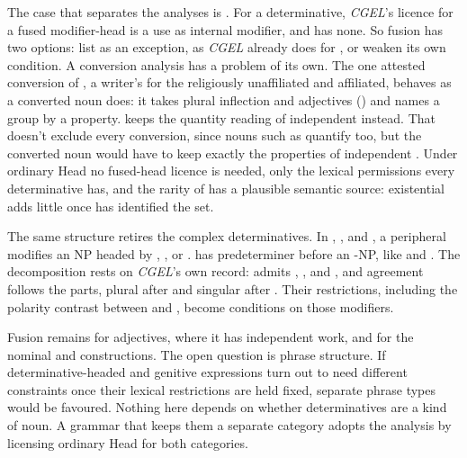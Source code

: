 \documentclass[12pt]{article}
\begin{document}
The case that separates the analyses is . For a determinative, \textit{CGEL}'s licence for a fused modifier-head is a use as internal modifier, and  has none. So fusion has two options: list  as an exception, as \textit{CGEL} already does for  \citep[377]{huddleston2002}, or weaken its own condition.
A conversion analysis has a problem of its own. The one attested conversion of , a writer's  for the religiously unaffiliated and affiliated, behaves as a converted noun does: it takes plural inflection and adjectives () and names a group by a property.  keeps the quantity reading of independent  instead. That doesn't exclude every conversion, since nouns such as  quantify too, but the converted noun would have to keep exactly the properties of independent . Under ordinary Head no fused-head licence is needed, only the lexical permissions every determinative has, and the rarity of  has a plausible semantic source: existential  adds little once  has identified the set.

The same structure retires the complex determinatives. In , , and , a peripheral  modifies an NP headed by , , or .  has predeterminer  before an -NP, like  and . The decomposition rests on \textit{CGEL}'s own record:  admits , , and , and agreement follows the parts, plural after  and singular after . Their restrictions, including the polarity contrast between  and , become conditions on those modifiers.

Fusion remains for adjectives, where it has independent work, and for the nominal  and  constructions. The open question is phrase structure. If determinative-headed and genitive expressions turn out to need different constraints once their lexical restrictions are held fixed, separate phrase types would be favoured. Nothing here depends on whether determinatives are a kind of noun. A grammar that keeps them a separate category adopts the analysis by licensing ordinary Head for both categories.

\clearpage
\printbibliography
\end{document}
